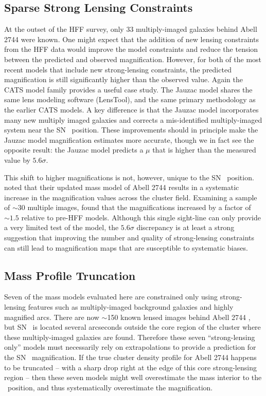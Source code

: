 \subsection{Sparse Strong Lensing Constraints}
\label{sec:SparseStrongLensingConstraints}

At the outset of the HFF survey, only 33 multiply-imaged galaxies
behind Abell 2744 were known.  One might expect that the addition of
new lensing constraints from the HFF data would improve the model
constraints and reduce the tension between the predicted and observed
magnification.  However, for both of the most recent
models \citep{Jauzac:2014c,Lam:2014} that include new strong-lensing
constraints, the predicted magnification is still significantly higher
than the observed value.  Again the CATS model family provides a
useful case study.  The Jauzac model shares the same lens modeling
software (LensTool), and the same primary methodology as the earlier
CATS models.  A key difference is that the Jauzac model incorporates
many new multiply imaged galaxies and corrects a mis-identified
multiply-imaged system near the SN \tomas\ position.  These
improvements should in principle make the Jauzac model magnification
estimates more accurate, though we in fact see the opposite result:
the Jauzac model predicts a $\mu$ that is higher than the measured
value by $5.6\sigma$.

This shift to higher magnifications is not, however, unique to the
SN \tomas\ position.  \citet{Jauzac:2014c} noted that their updated
mass model of Abell 2744 results in a systematic increase in the
magnification values across the cluster field. Examining a sample of
$\sim$30 multiple images, \citeauthor{Jauzac} found that the
magnifications increased by a factor of $\sim1.5$ relative to pre-HFF
models.  Although this single sight-line can only provide a very
limited test of the model, the $5.6\sigma$ discrepancy is at least a
strong suggestion that improving the number and quality of
strong-lensing constraints can still lead to magnification maps that
are susceptible to systematic biases.

\subsection{Mass Profile Truncation}
\label{sec:MassProfileTruncation}

Seven of the mass models evaluated here are constrained only using
strong-lensing features such as multiply-imaged background galaxies
and highly magnified arcs.  There are now $\sim$150 known lensed
images behind Abell 2744 \citep{Jauzac:2014c}, but SN \tomas\ is
located several arcseconds outside the core region of the cluster
where these multiply-imaged galaxies are found.  Therefore these seven
``strong-lensing only'' models must necessarily rely on extrapolations
to provide a prediction for the SN \tomas\ magnification.  If the true
cluster density profile for Abell 2744 happens to be truncated -- with
a sharp drop right at the edge of this core strong-lensing region --
then these seven models might well overestimate the mass interior to
the \tomas\ position, and thus systematically overestimate the
magnification.

